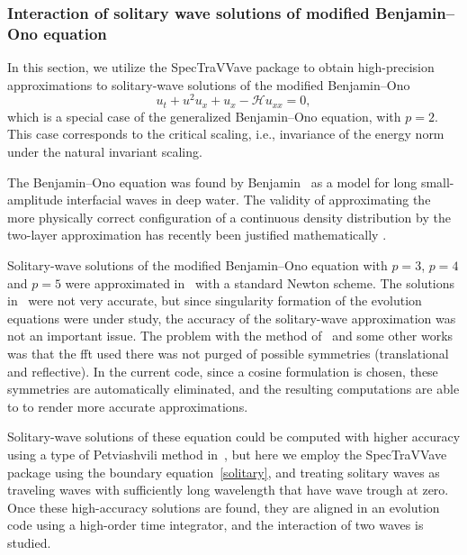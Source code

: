 
\subsubsection{Interaction of solitary wave solutions of modified Benjamin--Ono equation}
\label{mB-O-interact}

In this section, we utilize the \textsf{SpecTraVVave} package to obtain
high-precision approximations to solitary-wave solutions of
the modified Benjamin--Ono
\begin{equation*}
u_t + u^2u_x + u_x - \mathcal{H} u_{xx} = 0,
\end{equation*}
which is a special case of the generalized Benjamin--Ono equation, with $p=2$.
This case corresponds to the critical scaling, i.e., invariance of 
the energy norm under the natural invariant scaling.

The Benjamin--Ono equation was found by Benjamin~\cite{Benjamin1967} as a model
for long small-amplitude interfacial waves in deep water. 
The validity of approximating the more physically correct configuration of a continuous
density distribution by the two-layer approximation has recently been justified mathematically
\cite{Chen2016}. 
	

Solitary-wave solutions of the modified Benjamin--Ono equation with $p=3$, $p=4$ and $p=5$
were approximated in~\cite{Bona2004} with a standard Newton scheme.
The solutions in~\cite{Bona2004} were not very accurate, 
but since singularity formation of the evolution
equations were under study,
the accuracy of the solitary-wave approximation was not an important issue.
The problem with the method of~\cite{Bona2004} and some other works was that the fft
used there was not purged of possible symmetries (translational and reflective).
In the current code, since a cosine formulation is chosen, these symmetries
are automatically eliminated, and the resulting computations are able to to
render more accurate approximations. 

Solitary-wave solutions of these equation could be computed with higher accuracy
using a type of Petviashvili method in~\cite{Pelinovsky2004}, but here we employ
the \textsf{SpecTraVVave} package using the boundary equation~\eqref{solitary},
and treating solitary waves as 
traveling waves with sufficiently long wavelength 
that have wave trough at zero. 
Once these high-accuracy solutions are found, they are aligned in 
an evolution code using a high-order time integrator, and the
interaction of two waves is studied.

